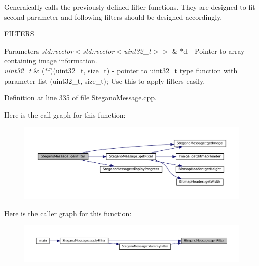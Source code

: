 Generaically calls the previously defined filter functions. They are designed to fit second parameter and following filters should be designed accordingly. 

F\+I\+L\+T\+E\+RS
\begin{DoxyParams}{Parameters}
{\em std\+::vector$<$std\+::vector$<$uint32\+\_\+t$>$$>$} & $\ast$d -\/ Pointer to array containing image information. \\
\hline
{\em uint32\+\_\+t} & ($\ast$f)(uint32\+\_\+t, size\+\_\+t) -\/ pointer to uint32\+\_\+t type function with parameter list (uint32\+\_\+t, size\+\_\+t); Use this to apply filters easily. \\
\hline
\end{DoxyParams}


Definition at line 335 of file Stegano\+Message.\+cpp.

Here is the call graph for this function\+:\nopagebreak
\begin{figure}[H]
\begin{center}
\leavevmode
\includegraphics[width=350pt]{classSteganoMessage_a1cb326688e9a054127396d198bd6f976_cgraph}
\end{center}
\end{figure}
Here is the caller graph for this function\+:\nopagebreak
\begin{figure}[H]
\begin{center}
\leavevmode
\includegraphics[width=350pt]{classSteganoMessage_a1cb326688e9a054127396d198bd6f976_icgraph}
\end{center}
\end{figure}
\mbox{\label{classSteganoMessage_a0134757a8c79caa9dca9bcce0686d1ef}} 
